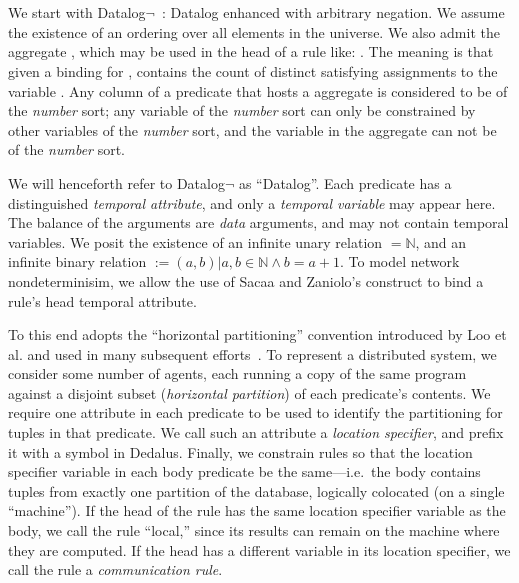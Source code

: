 \section{\large \bf \lang}
\label{sec:slang}

We start with Datalog$\lnot$~\cite{ullmanbook}: Datalog enhanced with arbitrary negation.  We assume the existence of an ordering \dedalus{<} over all elements in the universe.  We also admit the aggregate , which may be used in the head of a rule like: .  The meaning is that given a binding for ,  contains the count of distinct satisfying assignments to the variable .  Any column of a predicate that hosts a  aggregate is considered to be of the {\em number} sort; any variable of the {\em number} sort can only be constrained by other variables of the {\em number} sort, and the variable in the  aggregate can not be of the {\em number} sort.

We will henceforth refer to Datalog$\lnot$ as ``Datalog''.  Each predicate has a distinguished {\em temporal attribute}, and only a {\em temporal variable} may appear here.  The balance of the arguments are {\em data} arguments, and may not contain temporal variables.  We posit the existence of an infinite unary relation  $= \mathbb{N}$, and an infinite binary relation  $:= {(a,b) | a,b \in \mathbb{N} \land b = a + 1}$.  To model network nondeterminisim, we allow the use of Sacaa and Zaniolo's  construct to bind a rule's head temporal attribute.

 To this end \lang adopts the ``horizontal partitioning'' convention introduced by Loo et al. and used in many subsequent efforts~\cite{Loo:2005}. To represent a distributed system, we consider some number of agents, each running a copy of the same program against a disjoint subset ({\em horizontal partition}) of each predicate's contents.  We require one attribute in each predicate to be used to identify the partitioning for tuples in that predicate. We call such an attribute a {\em location specifier}, and prefix it with a \dedalus{\#} symbol in Dedalus.
Finally, we constrain \lang rules so that the location specifier variable in each body predicate be the same---i.e.\ the body contains tuples from exactly one partition of the database, logically colocated (on a single ``machine'').  If the head of the rule has the same location specifier variable as the body, we call the rule ``local,'' since its results can remain on the machine where they are computed.  If the head has a different variable in its location specifier, we call the rule a {\em communication rule}.

